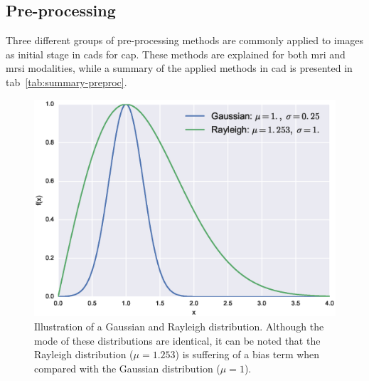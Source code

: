\subsection{Pre-processing}\label{subsec:chp3img-reg:prepro}
Three different groups of pre-processing methods are commonly applied to images as initial stage in \acp{cad} for \ac{cap}.
These methods are explained for both \ac{mri} and \ac{mrsi} modalities, while a summary of the applied methods in \ac{cad} is presented in \ac{tab}~\ref{tab:summary-preproc}.


\begin{figure}
\centering
	\includegraphics[width=0.7\linewidth]{3_review/figures/processing/pre-processing/noise/noisedistr.eps}
	\caption[Illustration of a Gaussian and Rayleigh distributions.]{Illustration of a Gaussian and Rayleigh distribution. Although the mode of these distributions are identical, it can be noted that the Rayleigh distribution ($\mu=1.253$) is suffering of a bias term when compared with the Gaussian distribution ($\mu=1$).}
	\label{fig:noisedistr}
\end{figure}

